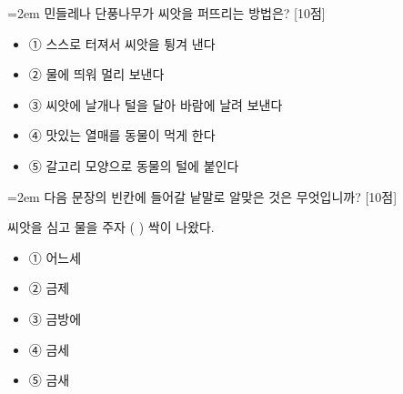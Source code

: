 \documentclass[12pt,a4paper]{article}
\newcommand{\qnum}[1]{%
  \tikz[baseline=(num.base)]{%
    \node[circle, fill=numCircle, text=white, inner sep=0pt,
          minimum size=18pt, font=\small\bfseries] (num) {#1};%
  }%
}
\newcommand{\pts}[1]{%
  \hfill\textcolor{ptsBadge}{[#1점]}%
}
\begin{document}
\vspace{4mm}
\begin{minipage}{\columnwidth}
{\hangindent=2em
\qnum{10}\enspace 민들레나 단풍나무가 씨앗을 퍼뜨리는 방법은? \pts{10}
\par}

\vspace{3mm}
\begin{itemize}[leftmargin=2.5em, labelsep=0.3em, label={}, itemsep=4pt, parsep=1pt, topsep=0pt]
  \item ① 스스로 터져서 씨앗을 튕겨 낸다
  \item ② 물에 띄워 멀리 보낸다
  \item ③ 씨앗에 날개나 털을 달아 바람에 날려 보낸다
  \item ④ 맛있는 열매를 동물이 먹게 한다
  \item ⑤ 갈고리 모양으로 동물의 털에 붙인다
\end{itemize}
\end{minipage}
\vspace{4mm}

\vspace{4mm}
\begin{minipage}{\columnwidth}
{\hangindent=2em
\qnum{11}\enspace 다음 문장의 빈칸에 들어갈 낱말로 알맞은 것은 무엇입니까? \pts{10}
\par}

\vspace{3mm}
\begin{tcolorbox}[bogi]
씨앗을 심고 물을 주자 (          ) 싹이 나왔다.
\end{tcolorbox}
\vspace{3mm}
\begin{itemize}[leftmargin=2.5em, labelsep=0.3em, label={}, itemsep=4pt, parsep=1pt, topsep=0pt]
  \item ① 어느세
  \item ② 금제
  \item ③ 금방에
  \item ④ 금세
  \item ⑤ 금새
\end{itemize}
\end{minipage}
\vspace{4mm}
\end{document}
